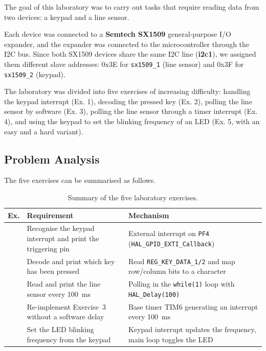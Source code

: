 \documentclass[english]{article}
\begin{document}
The goal of this laboratory was to carry out tasks that require reading data from two devices: a keypad and a
line sensor.

\noindent Each device was connected to a \textbf{Semtech SX1509} general-purpose I/O expander, and the expander
was connected to the microcontroller through the I2C bus. Since both SX1509 devices share the same I2C line
(\textbf{i2c1}), we assigned them different slave addresses: 0x3E for \texttt{sx1509\_1} (line sensor) and
0x3F for \texttt{sx1509\_2} (keypad).

\medskip
\noindent The laboratory was divided into five exercises of increasing difficulty: handling the keypad
interrupt (Ex. 1), decoding the pressed key (Ex. 2), polling the line sensor by software (Ex. 3), polling the
line sensor through a timer interrupt (Ex. 4), and using the keypad to set the blinking frequency of an LED
(Ex. 5, with an easy and a hard variant).

\subsection{Problem Analysis}

The five exercises can be summarised as follows.

\begin{table}[H]
  \centering
  \small
  \begin{tabular}{@{}%
      >{\raggedright\arraybackslash}p{}%
      >{\raggedright\arraybackslash}p{}%
      >{\raggedright\arraybackslash}p{}@{}}
    \toprule
    \textbf{Ex.} & \textbf{Requirement}                                                     & \textbf{Mechanism} \\
    \midrule
    1            & Recognise the keypad interrupt and print the triggering pin
                 & External interrupt on \texttt{PF4} (\texttt{HAL\_GPIO\_EXTI\_Callback})                       \\
    2            & Decode and print which key has been pressed
                 & Read \texttt{REG\_KEY\_DATA\_1/2} and map row/column bits to a character                      \\
    3            & Read and print the line sensor every 100~ms
                 & Polling in the \texttt{while(1)} loop with \texttt{HAL\_Delay(100)}                           \\
    4            & Re-implement Exercise~3 without a software delay
                 & Base timer TIM6 generating an interrupt every 100~ms                                          \\
    5            & Set the LED blinking frequency from the keypad
                 & Keypad interrupt updates the frequency, main loop toggles the LED                             \\
    \bottomrule
  \end{tabular}
  \caption{Summary of the five laboratory exercises.}
  \label{tab:lab1-exercises}
\end{table}
\end{document}
